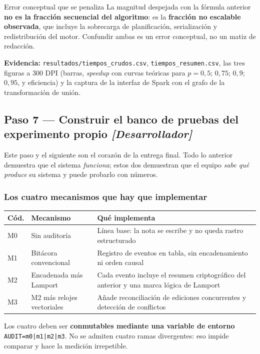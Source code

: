 \documentclass[11pt,a4paper]{article}
\newcommand{\paso}[1]{\subsection{#1}}
\begin{document}
	\begin{avisoBox}{Error conceptual que se penaliza}
		La magnitud despejada con la fórmula anterior \textbf{no es la fracción secuencial del algoritmo}: es la \textbf{fracción no escalable observada}, que incluye la sobrecarga de planificación, serialización y redistribución del motor. Confundir ambas es un error conceptual, no un matiz de redacción.
	\end{avisoBox}
	
	\textbf{Evidencia:} \texttt{resultados/tiempos\_crudos.csv}, \texttt{tiempos\_resumen.csv}, las tres figuras a 300 DPI (barras, \emph{speedup} con curvas teóricas para $p=0{,}5$; $0{,}75$; $0{,}9$; $0{,}95$, y eficiencia) y la captura de la interfaz de Spark con el grafo de la transformación de unión.
	
	\paso{Paso 7 --- Construir el banco de pruebas del experimento propio \emph{[Desarrollador]}}
	
	Este paso y el siguiente son el corazón de la entrega final. Todo lo anterior demuestra que el sistema \emph{funciona}; estos dos demuestran que el equipo \emph{sabe qué produce} su sistema y puede probarlo con números.
	
	\subsubsection{Los cuatro mecanismos que hay que implementar}
	
	\begin{center}
		\small
		\begin{tabular}{@{}p{1.1cm}p{4.3cm}p{9.5cm}@{}}
			\toprule
			\textbf{Cód.} & \textbf{Mecanismo} & \textbf{Qué implementa} \\
			\midrule
			M0 & Sin auditoría & Línea base: la nota se escribe y no queda rastro estructurado \\
			M1 & Bitácora convencional & Registro de eventos en tabla, sin encadenamiento ni orden causal \\
			M2 & Encadenada más Lamport & Cada evento incluye el resumen criptográfico del anterior y una marca lógica de Lamport \\
			M3 & M2 más relojes vectoriales & Añade reconciliación de ediciones concurrentes y detección de conflictos \\
			\bottomrule
		\end{tabular}
	\end{center}
	
	Los cuatro deben ser \textbf{conmutables mediante una variable de entorno} \texttt{AUDIT=m0|m1|m2|m3}. No se admiten cuatro ramas divergentes: eso impide comparar y hace la medición irrepetible.
	
\end{document}
